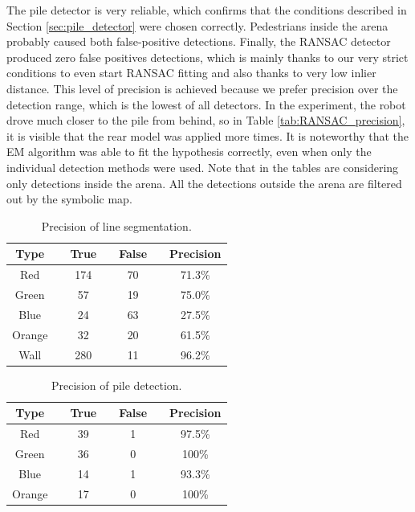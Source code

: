 The pile detector is very reliable, which confirms that the conditions described in Section \ref{sec:pile_detector} were chosen correctly. Pedestrians inside the arena probably caused both false-positive detections. Finally, the RANSAC detector produced zero false positives detections, which is mainly thanks to our very strict conditions to even start RANSAC fitting and also thanks to very low inlier distance. This level of precision is achieved because we prefer precision over the detection range, which is the lowest of all detectors. In the experiment, the robot drove much closer to the pile from behind, so in Table \ref{tab:RANSAC_precision}, it is visible that the rear model was applied more times. It is noteworthy that the EM algorithm was able to fit the hypothesis correctly, even when only the individual detection methods were used. Note that in the tables are considering only detections inside the arena. All the detections outside the arena are filtered out by the symbolic map.

\begin{table}[H]
	\centering
	\caption{Precision of line segmentation.}
	\begin{tabular}{ccccccc}
		\toprule
		Type &\quad& True &\quad& False &\quad& Precision \\
		\midrule
		Red &\quad& 174 &\quad& 70 &\quad&71.3\% \\
		Green &\quad& 57 &\quad& 19 &\quad& 75.0\% \\
		Blue &\quad& 24 &\quad& 63 &\quad& 27.5\% \\
		Orange &\quad& 32 &\quad& 20 &\quad& 61.5\% \\
		Wall &\quad& 280 &\quad& 11 &\quad& 96.2\% \\
		\bottomrule
	\end{tabular}
	\label{tab:seg_precision}
\end{table}


\begin{table}[H]
	\centering
	\caption{Precision of pile detection.}
	\begin{tabular}{ccccccc}
		\toprule
		Type &\quad& True &\quad& False &\quad& Precision \\
		\midrule
		Red &\quad& 39 &\quad& 1 &\quad& 97.5\% \\
		Green &\quad& 36 &\quad& 0 &\quad& 100\% \\
		Blue &\quad& 14 &\quad& 1 &\quad& 93.3\% \\
		Orange &\quad& 17 &\quad& 0 &\quad& 100\% \\
		\bottomrule
	\end{tabular}
	\label{tab:pile_precision}
\end{table}


